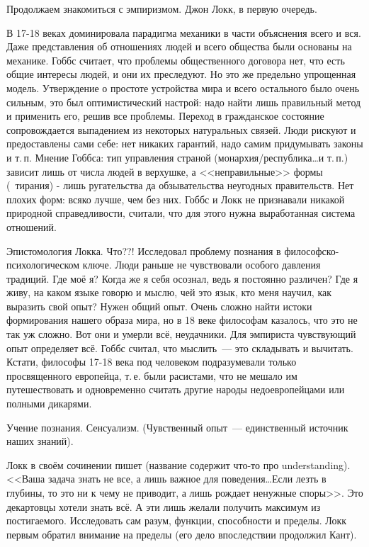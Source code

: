 Продолжаем знакомиться с эмпиризмом.
Джон Локк, в первую очередь.

В 17-18 веках доминировала парадигма механики в части объяснения всего и вся. Даже представления об отношениях людей и всего общества были основаны на механике. Гоббс считает, что проблемы общественного договора нет, что есть общие интересы людей, и они их преследуют. Но это же предельно упрощенная модель. Утверждение о простоте устройства мира и всего остального было очень сильным, это был оптимистический настрой: надо найти лишь правильный метод и применить его, решив все проблемы.
Переход в гражданское состояние сопровождается выпадением из некоторых натуральных связей. Люди рискуют и предоставлены сами себе: нет никаких гарантий, надо самим придумывать законы и т.\,п.
Мнение Гоббса: тип управления страной (монархия/республика\ldots и т.\,п.) зависит лишь от числа людей в верхушке, а <<неправильные>> формы (~тирания) - лишь ругательства да обзывательства неугодных правительств. Нет плохих форм: всяко лучше, чем без них.
Гоббс и Локк не признавали никакой природной справедливости, считали, что для этого нужна выработанная система отношений.

Эпистомология Локка. Что??!
Исследовал проблему познания в философско-психологическом ключе. Люди раньше не чувствовали особого давления традиций. Где моё я? Когда же я себя осознал, ведь я постоянно различен? Где я живу, на каком языке говорю и мыслю, чей это язык, кто меня научил, как выразить свой опыт? Нужен общий опыт. Очень сложно найти истоки формирования нашего образа мира, но в 18 веке философам казалось, что это не так уж сложно. Вот они и умерли всё, неудачники. Для эмпириста чувствующий опыт определяет всё. Гоббс считал, что мыслить~--- это складывать и вычитать. Кстати, философы 17-18 века под человеком подразумевали только просвященного европейца, т.\,е. были расистами, что не мешало им путешествовать и одновременно считать другие народы недоевропейцами или полными дикарями.

Учение познания. Сенсуализм. (Чувственный опыт~--- единственный источник наших знаний). 

Локк в своём сочинении пишет (название содержит что-то про understanding). <<Ваша задача знать не все, а лишь важное для поведения\ldots Если лезть в глубины, то это ни к чему не приводит, а лишь рождает ненужные споры>>. Это декартовцы хотели знать всё. А эти лишь желали получить максимум из постигаемого. Исследовать сам разум, функции, способности и пределы. Локк первым обратил внимание на пределы (его дело впоследствии продолжил Кант). 

